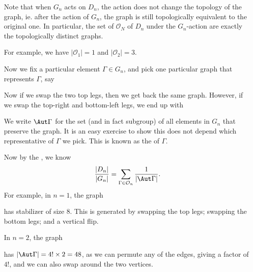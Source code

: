 \documentclass[a4paper]{article}
\begin{document}
Note that when $G_n$ acts on $D_n$, the action does not change the topology of the graph, ie. after the action of $G_n$, the graph is still topologically equivalent to the original one. In particular, the set of  $\mathcal{O}_N$ of $D_n$ under the $G_n$-action are exactly the topologically distinct graphs.

For example, we have $|\mathcal{O}_1| = 1$ and $|\mathcal{O}_2| = 3$.

Now we fix a particular element $\Gamma \in G_n$, and pick one particular graph that represents $\Gamma$, say
\begin{center}
\end{center}
Now if we swap the two top legs, then we get back the same graph. However, if we swap the top-right and bottom-left legs, we end up with
\begin{center}
\end{center}
We write $\Aut \Gamma$ for the set (and in fact subgroup) of all elements in $G_n$ that preserve the graph. It is an easy exercise to show this does not depend which representative of $\Gamma$ we pick. This is known as the  of $\Gamma$.

Now by the , we know
\[
  \frac{|D_n|}{|G_n|} = \sum_{\Gamma \in \mathcal{O}_n} \frac{1}{|\Aut\Gamma|}.
\]
For example, in $n = 1$, the graph
\begin{center}
\end{center}
has stabilizer of size $8$. This is generated by swapping the top legs; swapping the bottom legs; and a vertical flip.

In $n = 2$, the graph
\begin{center}
\end{center}
has $|\Aut \Gamma| = 4! \times 2 = 48$, as we can permute any of the edges, giving a factor of $4!$, and we can also swap around the two vertices.
\end{document}
